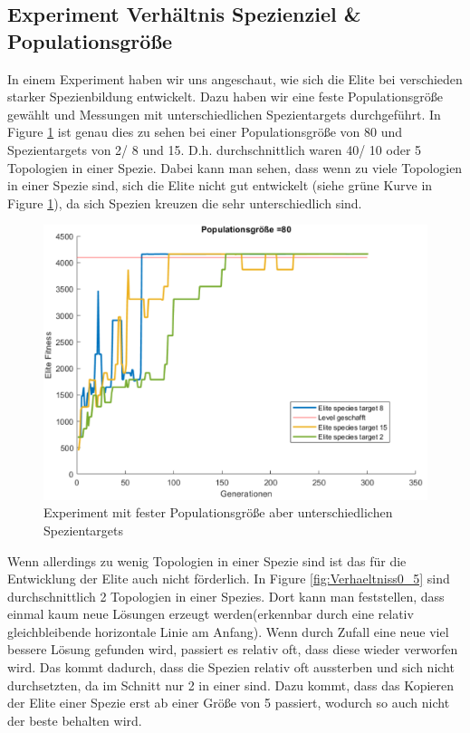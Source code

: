 \documentclass{hbrs-ecta-report}
\begin{document}
\subsection{Experiment Verhältnis Spezienziel \& Populationsgröße}
In einem Experiment haben wir uns angeschaut, wie sich die Elite bei verschieden starker Spezienbildung entwickelt. Dazu haben wir eine feste Populationsgröße gewählt und Messungen mit unterschiedlichen Spezientargets durchgeführt. In Figure \ref{fig:Spezien} ist genau dies zu sehen bei einer Populationsgröße von 80 und Spezientargets von 2/ 8 und 15. D.h. durchschnittlich waren 40/ 10 oder 5 Topologien in einer Spezie. Dabei kann man sehen, dass wenn zu viele Topologien in einer Spezie sind, sich die Elite nicht gut entwickelt (siehe grüne Kurve in Figure \ref{fig:Spezien}), da sich Spezien kreuzen die sehr unterschiedlich sind. \\
\begin{figure}[h!]
\centering
\includegraphics[width=\linewidth]{img/Mario_80_Netze_gesamt.png}
\caption{Experiment mit fester Populationsgröße aber unterschiedlichen Spezientargets}
\label{fig:Spezien} 
\end{figure}

Wenn allerdings zu wenig Topologien in einer Spezie sind ist das für die Entwicklung der Elite auch nicht förderlich. In Figure \ref{fig:Verhaeltniss0_5} sind durchschnittlich 2 Topologien in einer Spezies. Dort kann man feststellen, dass einmal kaum neue Lösungen erzeugt werden(erkennbar durch eine relativ gleichbleibende horizontale Linie am Anfang). Wenn durch Zufall eine neue viel bessere Lösung gefunden wird, passiert es relativ oft, dass diese wieder verworfen wird. Das kommt dadurch, dass die Spezien relativ oft aussterben und sich nicht durchsetzten, da im Schnitt nur 2 in einer sind. Dazu kommt, dass das Kopieren der Elite einer Spezie erst ab einer Größe von 5 passiert, wodurch so auch nicht der beste behalten wird.\\
 
\end{document}
